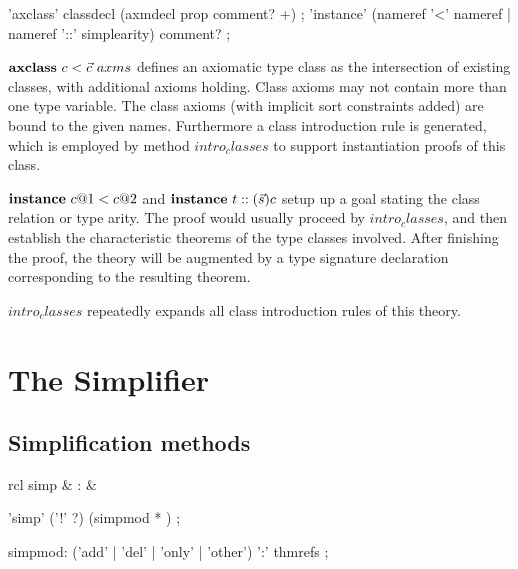 \begin{rail}
  'axclass' classdecl (axmdecl prop comment? +)
  ;
  'instance' (nameref '<' nameref | nameref '::' simplearity) comment?
  ;
\end{rail}

\begin{descr}
\item [${\mathord{\mathbf{axclass}}}~c < \vec c~axms$] defines an axiomatic type
  class as the intersection of existing classes, with additional axioms
  holding.  Class axioms may not contain more than one type variable.  The
  class axioms (with implicit sort constraints added) are bound to the given
  names.  Furthermore a class introduction rule is generated, which is
  employed by method $intro_classes$ to support instantiation proofs of this
  class.
  
\item [${\mathord{\mathbf{instance}}}~c@1 < c@2$ and ${\mathord{\mathbf{instance}}}~t ::
  (\vec s)c$] setup up a goal stating the class relation or type arity.  The
  proof would usually proceed by $intro_classes$, and then establish the
  characteristic theorems of the type classes involved.  After finishing the
  proof, the theory will be augmented by a type signature declaration
  corresponding to the resulting theorem.
\item [$intro_classes$] repeatedly expands all class introduction rules of
  this theory.
\end{descr}



\section{The Simplifier}

\subsection{Simplification methods}\label{sec:simp}

\begin{matharray}{rcl}
  simp & : & \isarmeth \\
\end{matharray}

\begin{rail}
  'simp' ('!' ?) (simpmod * )
  ;

  simpmod: ('add' | 'del' | 'only' | 'other') ':' thmrefs
  ;
\end{rail}

